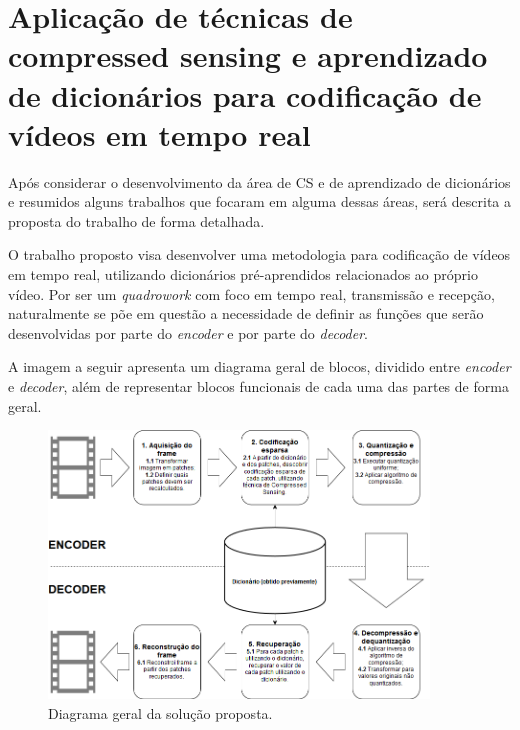 \documentclass[cic,tc]{iiufrgs}
\begin{document}
\chapter{Aplicação de técnicas de compressed sensing e aprendizado de dicionários para codificação de vídeos em tempo real}
\label{cap:proposta}
Após considerar o desenvolvimento da área de CS e de aprendizado de dicionários e 
resumidos alguns trabalhos que focaram em alguma dessas áreas, será descrita a proposta 
do trabalho de forma detalhada.

O trabalho proposto visa desenvolver uma metodologia para codificação de vídeos em
tempo real, utilizando dicionários pré-aprendidos relacionados ao próprio vídeo.
Por ser um \textit{quadrowork} com foco em tempo real, transmissão e recepção, 
naturalmente se põe em questão 
a necessidade de definir as funções que serão desenvolvidas por parte do \textit{encoder}
e por parte do \textit{decoder}.


A imagem a seguir apresenta um diagrama geral de blocos, dividido entre \textit{encoder}
e \textit{decoder}, além de representar blocos funcionais de cada uma das partes de 
forma geral.
\begin{figure}[H]
    \caption{Diagrama geral da solução proposta.}
    \begin{center}
        \includegraphics[width=0.9\textwidth]{img/DiagramaFinal.png}
    \end{center}
    \label{fig:geral}
\end{figure}
\end{document}

